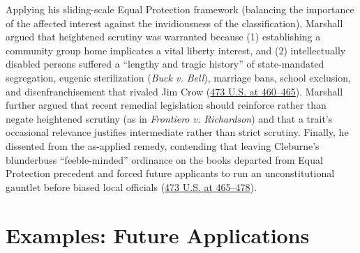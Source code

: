 \documentclass[12pt]{article}
\begin{document}
Applying his sliding-scale Equal Protection framework (balancing the importance of the affected interest against the invidiousness of the classification), Marshall argued that heightened scrutiny was warranted because (1) establishing a community group home implicates a vital liberty interest, and (2) intellectually disabled persons suffered a ``lengthy and tragic history'' of state-mandated segregation, eugenic sterilization (\textit{Buck v. Bell}), marriage bans, school exclusion, and disenfranchisement that rivaled Jim Crow (\href{https://supreme.justia.com/cases/federal/us/473/432/}{473 U.S. at 460--465}). Marshall further argued that recent remedial legislation should reinforce rather than negate heightened scrutiny (as in \textit{Frontiero v. Richardson}) and that a trait's occasional relevance justifies intermediate rather than strict scrutiny. Finally, he dissented from the as-applied remedy, contending that leaving Cleburne's blunderbuss ``feeble-minded'' ordinance on the books departed from Equal Protection precedent and forced future applicants to run an unconstitutional gauntlet before biased local officials (\href{https://supreme.justia.com/cases/federal/us/473/432/}{473 U.S. at 465--478}).

\section{Examples: Future Applications}
\end{document}
